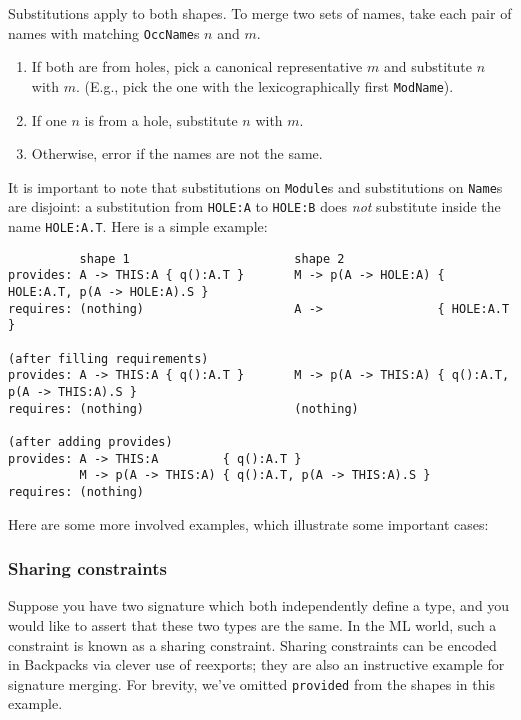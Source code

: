 \documentclass{article}
\begin{document}
Substitutions apply to both shapes.  To merge two sets of names, take
each pair of names with matching \verb|OccName|s $n$ and $m$.

\begin{enumerate}
    \item If both are from holes, pick a canonical representative $m$ and substitute $n$ with $m$. (E.g., pick the one with the lexicographically first \verb|ModName|).
    \item If one $n$ is from a hole, substitute $n$ with $m$.
    \item Otherwise, error if the names are not the same.
\end{enumerate}

It is important to note that substitutions on \verb|Module|s and substitutions on
\verb|Name|s are disjoint: a substitution from \verb|HOLE:A| to \verb|HOLE:B|
does \emph{not} substitute inside the name \verb|HOLE:A.T|.
Here is a simple example:

\begin{verbatim}
          shape 1                       shape 2
provides: A -> THIS:A { q():A.T }       M -> p(A -> HOLE:A) { HOLE:A.T, p(A -> HOLE:A).S }
requires: (nothing)                     A ->                { HOLE:A.T }

(after filling requirements)
provides: A -> THIS:A { q():A.T }       M -> p(A -> THIS:A) { q():A.T, p(A -> THIS:A).S }
requires: (nothing)                     (nothing)

(after adding provides)
provides: A -> THIS:A         { q():A.T }
          M -> p(A -> THIS:A) { q():A.T, p(A -> THIS:A).S }
requires: (nothing)
\end{verbatim}

Here are some more involved examples, which illustrate some important
cases:

\subsubsection{Sharing constraints}

Suppose you have two signature which both independently define a type,
and you would like to assert that these two types are the same.  In the
ML world, such a constraint is known as a sharing constraint.  Sharing
constraints can be encoded in Backpacks via clever use of reexports;
they are also an instructive example for signature merging.
For brevity, we've omitted \verb|provided| from the shapes in this example.
\end{document}
